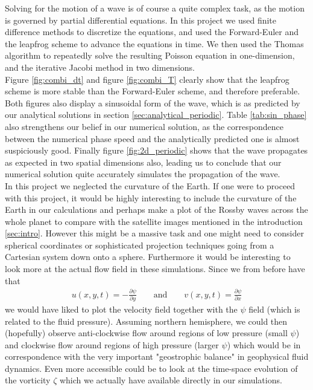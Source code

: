 \documentclass[12pt]{article}
\numberwithin{figure}{section}
\numberwithin{table}{section}
\begin{document}
\noindent Solving for the motion of a wave is of course a quite complex task, as the motion is governed by partial differential equations. In this project we used finite difference methods to discretize the equations, and used the Forward-Euler and the leapfrog scheme to advance the equations in time. We then used the Thomas algorithm to repeatedly solve the resulting Poisson equation in one-dimension, and the iterative Jacobi method in two dimensions.\\

\noindent Figure \ref{fig:combi_dt} and figure \ref{fig:combi_T} clearly show that the leapfrog scheme is more stable than the Forward-Euler scheme, and therefore preferable. Both figures also display a sinusoidal form of the wave, which is as predicted by our analytical solutions in section \ref{sec:analytical_periodic}. Table \ref{tab:sin_phase} also strengthens our belief in our numerical solution, as the correspondence between the numerical phase speed and the analytically predicted one is almost suspiciously good. Finally figure \ref{fig:2d_periodic} shows that the wave propagates as expected in two spatial dimensions also, leading us to conclude that our numerical solution quite accurately simulates the propagation of the wave.\\

\noindent In this project we neglected the curvature of the Earth. If one were to proceed with this project, it would be highly interesting to include the curvature of the Earth in our calculations and perhaps make a plot of the Rossby waves across the whole planet to compare with the satellite images mentioned in the introduction \ref{sec:intro}. However this might be a massive task and one might need to consider spherical coordinates or sophisticated projection techniques going from a Cartesian system down onto a sphere. Furthermore it would be interesting to look more at the actual flow field in these simulations. Since we from before have that
\begin{eqnarray}
	u(x,y,t)=-\frac{\partial\psi}{\partial y} \qquad\text{and}\qquad v(x,y,t)=\frac{\partial\psi}{\partial x}
\end{eqnarray}
we would have liked to plot the velocity field together with the $\psi$ field (which is related to the fluid pressure). Assuming northern hemisphere, we could then (hopefully) observe anti-clockwise flow around regions of low pressure (small $\psi$) and clockwise flow around regions of high pressure (larger $\psi$) which would be in correspondence with the very important "geostrophic balance" in geophysical fluid dynamics. Even more accessible could be to look at the time-space evolution of the vorticity $\zeta$ which we actually have  available directly in our simulations.

\pagebreak


{}

\end{document}
